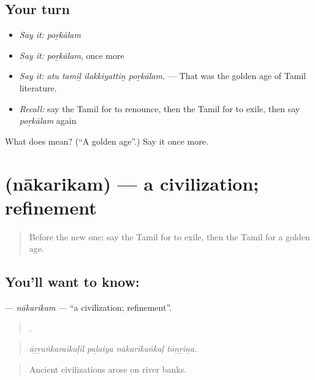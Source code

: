 \subsection*{Your turn}
\begin{itemize}
\raggedright
  \item \emph{Say it:} \emph{poṟkālam}
  \item \emph{Say it:} \emph{poṟkālam}, once more
  \item \emph{Say it:} \emph{atu tamiḻ ilakkiyattiṉ poṟkālam.} — That was the golden age of Tamil literature.
  \item \emph{Recall:} say the Tamil for to renounce, then the Tamil for to exile, then say \emph{poṟkālam} again
\end{itemize}

\begin{tcolorbox}[breakable,colback=teal!4,colframe=teal!35!black,title={Before you move on}]
What does  mean? (\textquotedblleft{}A golden age\textquotedblright{}.) Say it once more.
\end{tcolorbox}
\section[\texorpdfstring{\ta{நாகரிகம்} (nākarikam)}{நாகரிகம் (nākarikam)}]{ (nākarikam) — a civilization; refinement}

\label{lesson:TA-C340-nakarikam}



\begin{quote}
Before the new one: say the Tamil for to exile, then the Tamil for a golden age.
\end{quote}

\subsection*{You'll want to know: }
\textbf{} — \emph{nākarikam} — \textquotedblleft{}a civilization; refinement\textquotedblright{}.

\begin{quote}
   .
\end{quote}

\begin{quote}
\emph{āṟṟaṅkaraikaḷil paḻaiya nākarikaṅkaḷ tōṉṟiṉa.}
\end{quote}

\begin{quote}
Ancient civilizations arose on river banks.
\end{quote}

